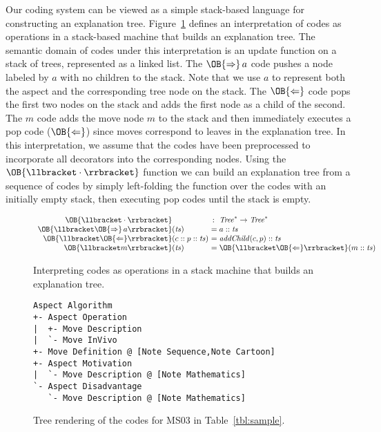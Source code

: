\documentclass[sigconf]{acmart}
\newcommand{\Push}{\OB{\Rightarrow}}
\newcommand{\Pop}{\OB{\Leftarrow}}
\newcommand{\Sem}[1]{\OB{\llbracket#1\rrbracket}}
\begin{document}
Our coding system can be viewed as a simple stack-based language for
constructing an explanation tree. Figure~\ref{fig:semantics} defines an
interpretation of codes as operations in a stack-based machine that builds an
explanation tree.
%
The semantic domain of codes under this interpretation is an update function on
a stack of trees, represented as a linked list. The $\Push\,a$ code pushes a
node labeled by $a$ with no children to the stack. Note that we use $a$ to
represent both the aspect and the corresponding tree node on the stack. The
$\Pop$ code pops the first two nodes on the stack and adds the first node as a
child of the second. The $m$ code adds the move node $m$ to the stack and then
immediately executes a pop code ($\Pop$) since moves correspond to leaves in
the explanation tree.
%
In this interpretation, we assume that the codes have been preprocessed to
incorporate all decorators into the corresponding nodes.
%
Using the $\Sem{\cdot}$ function we can build an explanation tree from a
sequence of codes by simply left-folding the function over the codes with an
initially empty stack, then executing pop codes until the stack is empty.


\newcommand{\TS}{\mathit{ts}}

\begin{figure}
\[
\begin{array}{r@{}l@{~}l}
\Sem{\cdot}    &            &\,:~ \mathit{Tree}^* \to \mathit{Tree}^* \\
\Sem{\Push\,a} &(\TS)       &= a::\TS \\
\Sem{\Pop}     &(c::p::\TS) &= \mathit{addChild}(c,p)::\TS \\
\Sem{m}        &(\TS)       &= \Sem{\Pop}(m::\TS)
\end{array}
\]
\vspace{-2ex}
\caption{Interpreting codes as operations in a stack machine that builds an
explanation tree.}
\label{fig:semantics}
\vspace{-2ex}
\end{figure}


\begin{figure}
\begin{Verbatim}[fontsize=\small,xleftmargin=2ex]
Aspect Algorithm
+- Aspect Operation
|  +- Move Description
|  `- Move InVivo
+- Move Definition @ [Note Sequence,Note Cartoon]
+- Aspect Motivation
|  `- Move Description @ [Note Mathematics]
`- Aspect Disadvantage
   `- Move Description @ [Note Mathematics]
\end{Verbatim}
\vspace{-1.5ex}
\caption{Tree rendering of the codes for MS03 in Table~\ref{tbl:sample}.}
\label{fig:tree}
\vspace{-2ex}
\end{figure}
\end{document}
